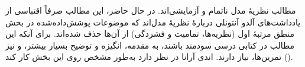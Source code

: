 \documentclass[../../include/open-logic-part]{subfiles}
\begin{document}

\begin{editorial}
  مطالب نظریهٔ مدل ناتمام و آزمایشی‌اند. در حال حاضر، این مطالب صرفاً
  اقتباسی از یادداشت‌های آلدو آنتونلی دربارهٔ نظریهٔ مدل‌اند که موضوعات
  پوشش‌داده‌شده در بخش منطق مرتبهٔ اول (نظریه‌ها، تمامیت و فشردگی) از
  آن‌ها حذف شده‌اند. برای آنکه این مطالب در کتابی درسی سودمند باشند،
  به مقدمه، انگیزه و توضیح بسیار بیشتر، و نیز تمرین‌ها، نیاز دارند.
  اندی آرانا در نظر دارد به‌طور مشخص روی این بخش کار کند
  ().
\end{editorial}





\OLEndPartHook
\end{document}
